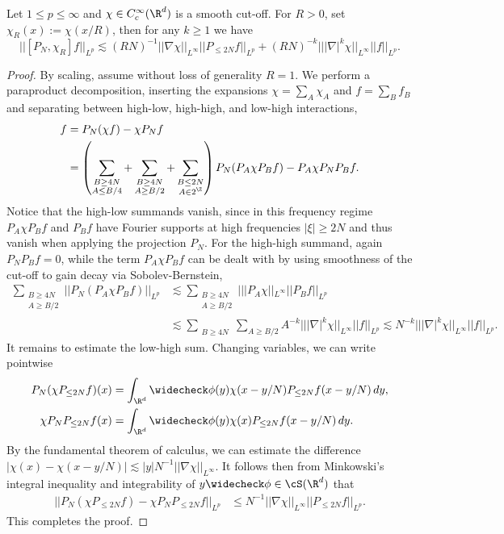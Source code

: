 \begin{proposition}
	Let $1 \leq p \leq \infty$ and $\chi \in C^\infty_c (\R^d)$ is a smooth cut-off. For $R > 0$, set $\chi_R (x) := \chi (x/R)$, then for any $k \geq 1$ we have 
		\[ || [P_N, \chi_R] f||_{L^p} \lesssim (RN)^{-1} ||\nabla \chi||_{L^\infty} || {P_{\leq 2N}} f||_{L^p} +  (RN)^{-k} || |\nabla|^k \chi||_{L^\infty}||f||_{L^p} .\]
\end{proposition}

\begin{proof}
	By scaling, assume without loss of generality $R  = 1$. We perform a paraproduct decomposition, inserting the expansions $\chi = \sum_A \chi_A$ and $f = \sum_B f_B$ and separating between high-low, high-high, and low-high interactions,
		\begin{align*}
			[P_N, \chi] f 
				&= P_N (\chi f) - \chi P_N f\\
				&= \left(\sum_{\substack{B \geq 4N \\ A \leq B/4}} + \sum_{\substack{B \geq 4N \\ A \geq B/2}} + \sum_{\substack{B \leq 2N \\ A \in 2^\Z}} \right) P_N (P_A \chi P_B f) - P_A \chi P_N P_B f.
		\end{align*}	
	Notice that the high-low summands vanish, since in this frequency regime $P_A \chi P_B f$ and $P_B f$ have Fourier supports at high frequencies $|\xi| \geq 2N$ and thus vanish when applying the projection $P_N$. For the high-high summand, again $P_N P_B f = 0$, while the term $P_A \chi P_B f$ can be dealt with by using smoothness of the cut-off to gain decay via Sobolev-Bernstein, 
		\begin{align*}
			 \sum_{\substack{B \geq 4N \\ A \geq B/2}} || P_N  (P_A \chi P_B f) ||_{L^p}
			 	&\lesssim \sum_{\substack{B \geq 4N \\ A \geq B/2}}  || | P_A \chi||_{L^\infty} || P_B f ||_{L^p} \\
			 	&\lesssim \sum_{\substack{B \geq 4N }} \sum_{A \geq B/2} A^{-k} || |\nabla|^k \chi||_{L^\infty} ||f||_{L^p}  \lesssim N^{-k} || |\nabla|^k \chi||_{L^\infty} ||f||_{L^p} . 
		\end{align*}	 
	It remains to estimate the low-high sum. Changing variables, we can write pointwise	
		\begin{align*}
			P_N (\chi P_{\leq 2N} f) (x) 
				&= \int_{\R^d} \widecheck \phi (y) \chi (x - y/N) P_{\leq 2N} f(x - y/N) \, dy,\\
			\chi P_N P_{\leq 2N} f (x)
				&= \int_{\R^d} \widecheck \phi (y) \chi (x) P_{\leq 2N} f (x - y/N) \, dy.
		\end{align*}
	By the fundamental theorem of calculus, we can estimate the difference $|\chi(x) - \chi(x - y/N)| \lesssim |y| N^{-1} ||\nabla \chi||_{L^\infty}$. It follows then from Minkowski's integral inequality and integrability of $y \widecheck \phi \in \cS (\R^d)$ that 
		\begin{align*}
			||P_N (\chi P_{\leq 2N} f) - \chi P_N P_{\leq 2N} f||_{L^p}
				&\leq N^{-1} ||\nabla \chi||_{L^\infty} ||P_{\leq 2N} f||_{L^p}.
		\end{align*}	
	This completes the proof. 
\end{proof}	

